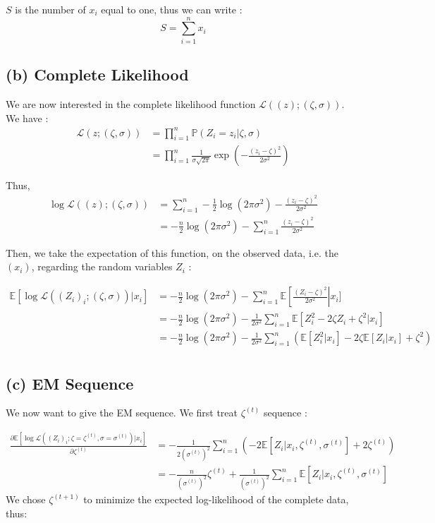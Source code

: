 \documentclass{article}
\begin{document}
 \noindent $S$ is the number of $x_i$ equal to one, thus we can write :
 \[S = \sum_{i=1}^{n} x_i\]

 \subsection*{(b) Complete Likelihood}

 We are now interested in the complete likelihood function $\mathcal{L}((z); (\zeta, \sigma ))$. We have : 
 \begin{align*}
    \mathcal{L}(z; (\zeta, \sigma )) 
            &= \prod_{i=1}^{n} \mathbb{P}(Z_i = z_i | \zeta, \sigma) \\
            &= \prod_{i=1}^{n} \frac{1}{\sigma \sqrt{2\pi}} \exp \left (- \frac{(z_i - \zeta)^2}{2\sigma^2}\right )
 \end{align*}

Thus, 
\begin{align*}
   \log  \mathcal{L}(( z); (\zeta, \sigma ))  
     &= \sum_{i=1}^n - \frac{1}{2} \log (2\pi \sigma^2) - \frac{(z_i-\zeta)^2}{2\sigma^2} \\
    &= - \frac{n}{2} \log (2\pi \sigma^2) - \sum_{i=1}^n  \frac{(z_i-\zeta)^2}{2\sigma^2}
    \end{align*}

Then, we take the expectation of this function, on the observed data, i.e. the $(x_i)$, regarding the random
variables $Z_i$ : 

\begin{align*}
    \mathbb{E}\left [ \log \mathcal{L}( (Z_i)_i; (\zeta, \sigma )) |x_i \right ] &= 
    - \frac{n}{2} \log (2\pi \sigma^2) - \sum_{i=1}^n \mathbb{E} \left [   \frac{(Z_i-\zeta)^2}{2\sigma^2} \right|x_i ] \\
    &= - \frac{n}{2} \log (2\pi \sigma^2) -\frac{1}{2\sigma^2} \sum_{i=1}^n \mathbb{E}  [  Z_i^2 - 2 \zeta Z_i + \zeta^2  | x_i ] \\
    &= - \frac{n}{2} \log (2\pi \sigma^2) -\frac{1}{2\sigma^2} \sum_{i=1}^n ( \mathbb{E} [ Z_i^2|x_i ]- 2 \zeta\mathbb{E}  [ Z_i|x_i] + \zeta^2 ) \\
\end{align*}

\subsection*{(c) EM Sequence}
We now want to give the EM sequence. We first treat $\zeta^{(t)}$ sequence :

\begin{align*}
    \frac{\partial
    \mathbb{E}\left [ \log \mathcal{L}( (Z_i)_i; \zeta = \zeta^{(t)}, \sigma = \sigma^{(t)}) |x_i \right ]
    }{\partial \zeta^{(t)} }
    &= -\frac{1}{2(\sigma^{(t)})^2} \sum_{i=1}^{n} (- 2\mathbb{E}[Z_i|x_i , \zeta^{(t)}, \sigma^{(t)}]
    +2 \zeta^{(t)}) \\
    &= - \frac{n}{(\sigma^{(t)})^2}  \zeta^{(t)} + \frac{1}{(\sigma^{(t)})^2} \sum_{i=1}^{n}  \mathbb{E}[Z_i|x_i, \zeta^{(t)}, \sigma^{(t)}]
\end{align*} 
We chose $\zeta^{(t+1)}$ to minimize the expected log-likelihood of the complete data, thus: 
\end{document}
